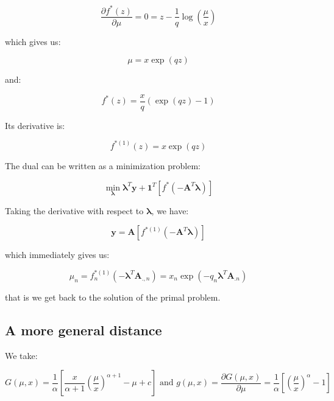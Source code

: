 \documentclass{tex/note}
\begin{document}
\begin{equation*}
\frac{\partial f^* \left( z \right)}{\partial \mu} = 0 = z - \frac{1}{q} \log \left( \frac{\mu}{x} \right)
\end{equation*}

which gives us:

\begin{equation*}
\mu = x \exp \left( q z \right)
\end{equation*}

and:

\begin{equation*}
f^* \left( z \right) = \frac{x}{q} \left( \exp \left( q z \right) - 1 \right)
\end{equation*}

Its derivative is:

\begin{equation*}
f^{* \left( 1 \right)} \left( z \right) = x \exp \left( q z \right)
\end{equation*}

The dual can be written as a minimization problem:

\begin{equation*}
\min_{\bm{\lambda}} \bm{\lambda}^T \bm{y} + \bm{1}^T \left[ f^* \left( - \bm{A}^T \bm{\lambda} \right) \right] 
\end{equation*}

Taking the derivative with respect to $\bm{\lambda}$, we have:

\begin{equation*}
\bm{y} = \bm{A} \left[ f^{* \left( 1 \right)} \left( - \bm{A}^T \bm{\lambda} \right) \right]
\end{equation*}

which immediately gives us:

\begin{equation*}
\mu_n = f_n^{* \left( 1 \right)} \left( - \bm{\lambda}^T \bm{A}_{.,n} \right) = x_n \exp \left( - q_n \bm{\lambda}^T \bm{A}_{.n} \right)
\end{equation*}

that is we get back to the solution of the primal problem.

\subsection{A more general distance}

We take:

\begin{equation*}
G \left( \mu , x \right) = \frac{1}{\alpha} \left[ \frac{x}{\alpha + 1} \left( \frac{\mu}{x} \right) ^{\alpha + 1} - \mu + c \right] \text{ and } g \left( \mu , x \right) = \frac{\partial G \left( \mu , x \right)}{\partial \mu} = \frac{1}{\alpha} \left[ \left( \frac{\mu}{x} \right) ^{\alpha} - 1\right]
\end{equation*}
\end{document}
